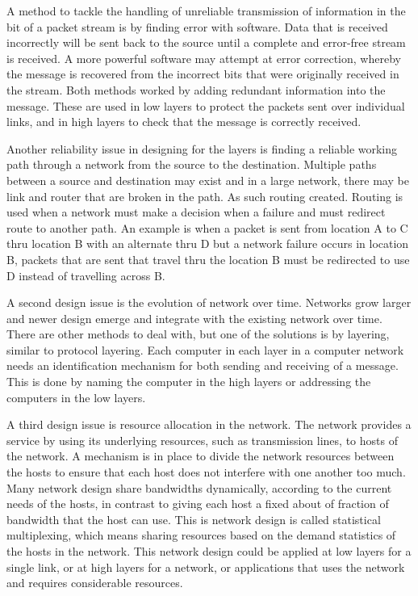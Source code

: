 A method to tackle the handling of unreliable transmission of information in the bit of a packet stream is by finding error with software. Data that is received incorrectly will be sent back to the source until a complete and error-free stream is received. A more powerful software may attempt at error correction, whereby the message is recovered from the incorrect bits that were originally received in the stream. Both methods worked by adding redundant information into the message. These are used in low layers to protect the packets sent over individual links, and in high layers to check that the message is correctly received.

Another reliability issue in designing for the layers is finding a reliable working path through a network from the source to the destination. Multiple paths between a source and destination may exist and in a large network, there may be link and router that are broken in the path. As such routing created. Routing is used when a network must make a decision when a failure and must redirect route to another path. An example is when a packet is sent from location A to C thru location B with an alternate thru D but a network failure occurs in location B, packets that are sent that travel thru the location B must be redirected to use D instead of travelling across B.

A second design issue is the evolution of network over time. Networks grow larger and newer design emerge and integrate with the existing network over time. There are other methods to deal with, but one of the solutions is by layering, similar to protocol layering. Each computer in each layer in a computer network needs an identification mechanism for both sending and receiving of a message. This is done by naming the computer in the high layers or addressing the computers in the low layers.

A third design issue is resource allocation in the network. The network provides a service by using its underlying resources, such as transmission lines, to hosts of the network. A mechanism is in place to divide the network resources between the hosts to ensure that each host does not interfere with one another too much. Many network design share bandwidths dynamically, according to the current needs of the hosts, in contrast to giving each host a fixed about of fraction of bandwidth that the host can use. This is network design is called statistical multiplexing, which means sharing resources based on the demand statistics of the hosts in the network. This network design could be applied at low layers for a single link, or at high layers for a network, or applications that uses the network and requires considerable resources. 

